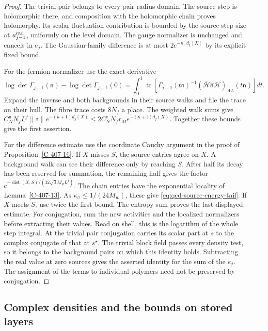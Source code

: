 \documentclass[11pt,letterpaper,reqno]{amsart}
\theoremstyle{definition}
\theoremstyle{remark}
\begin{document}
\begin{proof}
The trivial pair belongs to every pair-radius domain.
The source step is holomorphic there, and composition
with the holomorphic chain proves holomorphy. Its scalar
fluctuation contribution is bounded by the source-step
size at $a_{j-1}^{\rm rad}$, uniformly on the level domain.
The gauge normalizer is unchanged and cancels in $e_j$.
The Gaussian-family difference is at most
$2e^{-\kappa_+d_j(X)}$ by its explicit fixed bound.

For the fermion normalizer use the exact derivative
\[
 \log\det\Gamma_{j-1}(\mathsf n)-\log\det\Gamma_{j-1}(0)
 =\int_0^1\operatorname{tr}\left[
 \Gamma_{j-1}(t\mathsf n)^{-1}
 (\bar{\mathcal H}\widehat{\mathsf n}\mathcal H)_{AA}
                       (t\mathsf n)\right]dt.
\]
Expand the inverse and both backgrounds in their source
walks and file the trace on their hull. The fibre trace
costs $8N_f$ a place. The weighted walk sums give
$C_N^{\mathsf n}N_fL^j\|\mathsf n\|e^{-(\kappa+1)d_j(X)}
\le2C_N^{\mathsf n}N_fr_Me^{-(\kappa+1)d_j(X)}$.
Together these bounds give the first assertion.

For the difference estimate use the coordinate Cauchy
argument in the proof of Proposition~\ref{C-407-16}.
If $X$ misses $S$, the source entries agree on $X$.
A background walk can see their difference only by
reaching $S$. After half its decay has been reserved
for summation, the remaining half gives the factor
$e^{-\operatorname{dist}(X,S)/(12\sqrt3M_wL^j)}$.
The chain entries have the exponential locality of
Lemma~\ref{C-407-13}. As
$\kappa_\sigma\le1/(24M_w)$, these give
\eqref{eq:qcd-source-energy-tail}. If $X$ meets $S$,
use twice the first bound. The entropy sum proves the
last displayed estimate. For conjugation, sum the new activities
and the localized normalizers before extracting their values.
Read on shell, this is the logarithm of the whole step integral.
At the trivial pair conjugation carries its scalar part at $s$
to the complex conjugate of that at $s^\star$. The trivial
block field passes every density test, so it belongs to the
background pairs on which this identity holds. Subtracting
the real value at zero sources gives the asserted identity
for the sum of the $e_j$. The assignment of the terms to
individual polymers need not be preserved by conjugation.
\end{proof}

\subsection{Complex densities and the bounds on stored layers}
\end{document}
